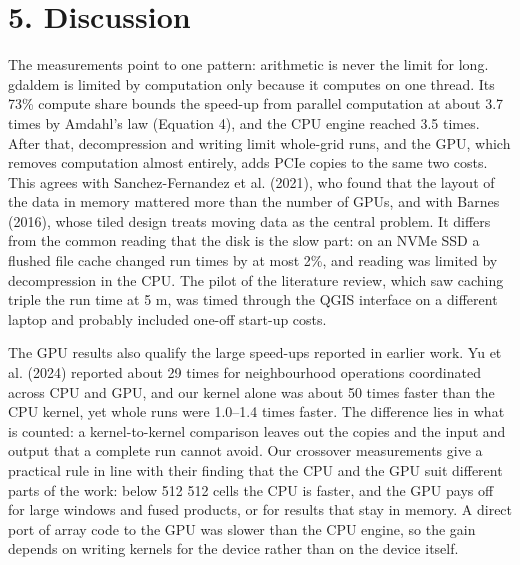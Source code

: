 \documentclass[10pt,a4paper]{article}
\begin{document}
\section*{5. Discussion}
The measurements point to one pattern: arithmetic is never the limit for long. gdaldem is limited by computation only because it computes on one thread. Its 73\% compute share bounds the speed-up from parallel computation at about 3.7 times by Amdahl's law (Equation 4), and the CPU engine reached 3.5 times. After that, decompression and writing limit whole-grid runs, and the GPU, which removes computation almost entirely, adds PCIe copies to the same two costs. This agrees with Sanchez-Fernandez et al. (2021), who found that the layout of the data in memory mattered more than the number of GPUs, and with Barnes (2016), whose tiled design treats moving data as the central problem. It differs from the common reading that the disk is the slow part: on an NVMe SSD a flushed file cache changed run times by at most 2\%, and reading was limited by decompression in the CPU. The pilot of the literature review, which saw caching triple the run time at 5 m, was timed through the QGIS interface on a different laptop and probably included one-off start-up costs.

The GPU results also qualify the large speed-ups reported in earlier work. Yu et al. (2024) reported about 29 times for neighbourhood operations coordinated across CPU and GPU, and our kernel alone was about 50 times faster than the CPU kernel, yet whole runs were 1.0--1.4 times faster. The difference lies in what is counted: a kernel-to-kernel comparison leaves out the copies and the input and output that a complete run cannot avoid. Our crossover measurements give a practical rule in line with their finding that the CPU and the GPU suit different parts of the work: below 512 \texttimes{} 512 cells the CPU is faster, and the GPU pays off for large windows and fused products, or for results that stay in memory. A direct port of array code to the GPU was slower than the CPU engine, so the gain depends on writing kernels for the device rather than on the device itself.
\end{document}
